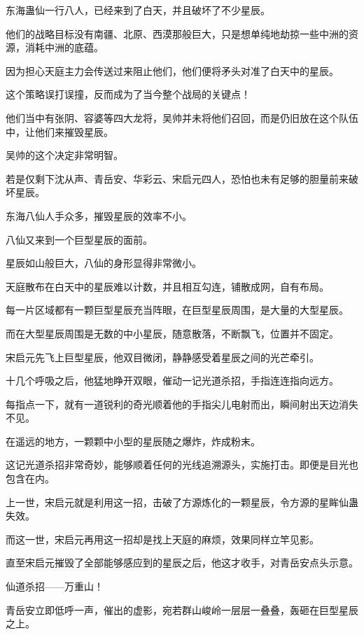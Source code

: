 
\begin{this_body}



东海蛊仙一行八人，已经来到了白天，并且破坏了不少星辰。

他们的战略目标没有南疆、北原、西漠那般巨大，只是想单纯地劫掠一些中洲的资源，消耗中洲的底蕴。

因为担心天庭主力会传送过来阻止他们，他们便将矛头对准了白天中的星辰。

这个策略误打误撞，反而成为了当今整个战局的关键点！

他们当中有张阴、容婆等四大龙将，吴帅并未将他们召回，而是仍旧放在这个队伍中，让他们来摧毁星辰。

吴帅的这个决定非常明智。

若是仅剩下沈从声、青岳安、华彩云、宋启元四人，恐怕也未有足够的胆量前来破坏星辰。

东海八仙人手众多，摧毁星辰的效率不小。

八仙又来到一个巨型星辰的面前。

星辰如山般巨大，八仙的身形显得非常微小。

天庭散布在白天中的星辰难以计数，并且相互勾连，铺散成网，自有布局。

每一片区域都有一颗巨型星辰充当阵眼，在巨型星辰周围，是大量的大型星辰。

而在大型星辰周围是无数的中小星辰，随意散落，不断飘飞，位置并不固定。

宋启元先飞上巨型星辰，他双目微闭，静静感受着星辰之间的光芒牵引。

十几个呼吸之后，他猛地睁开双眼，催动一记光道杀招，手指连连指向远方。

每指点一下，就有一道锐利的奇光顺着他的手指尖儿电射而出，瞬间射出天边消失不见。

在遥远的地方，一颗颗中小型的星辰随之爆炸，炸成粉末。

这记光道杀招非常奇妙，能够顺着任何的光线追溯源头，实施打击。即便是目光也包含在内。

上一世，宋启元就是利用这一招，击破了方源炼化的一颗星辰，令方源的星眸仙蛊失效。

而这一世，宋启元再用这一招却是找上天庭的麻烦，效果同样立竿见影。

直至宋启元摧毁了全部能够感应到的星辰之后，他这才收手，对青岳安点头示意。

仙道杀招——万重山！

青岳安立即低呼一声，催出的虚影，宛若群山峻岭一层层一叠叠，轰砸在巨型星辰之上。


\end{this_body}
